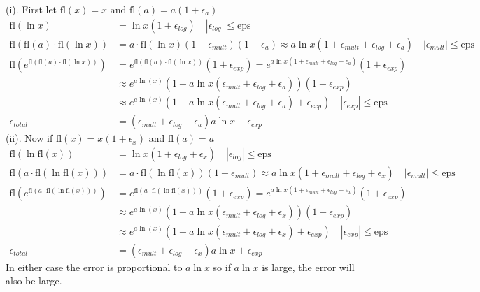 \documentclass[12pt]{article}
\begin{document}
(i). First let $\mathrm{fl}(x) = x$ and $\mathrm{fl}(a) = a(1+\epsilon_a)$
\begin{align*}
\mathrm{fl}(\ln x) &= \ln x(1 + \epsilon_{log}) \quad |\epsilon_{log}| \le \mathrm{eps}
\\
\mathrm{fl}(\mathrm{fl}(a) \cdot \mathrm{fl}(\ln x)) &= a \cdot \mathrm{fl}(\ln x)(1 + \epsilon_{mult}) (1 + \epsilon_a) \approx a \ln x (1 + \epsilon_{mult} + \epsilon_{log} + \epsilon_a) \quad |\epsilon_{mult}| \le \mathrm{eps}
\\
\mathrm{fl}(e^{\mathrm{fl}(\mathrm{fl}(a) \cdot \mathrm{fl}(\ln x))}) &= e^{\mathrm{fl}(\mathrm{fl}(a) \cdot \mathrm{fl}(\ln x))} (1 + \epsilon_{exp}) = e^{a \ln x (1 + \epsilon_{mult} + \epsilon_{log} + \epsilon_a)}(1 + \epsilon_{exp})
\\
&\approx e^{a \ln(x)}(1 + a \ln x (\epsilon_{mult} + \epsilon_{log} + \epsilon_a))(1 + \epsilon_{exp})
\\
&\approx e^{a \ln(x)}(1 + a \ln x (\epsilon_{mult} + \epsilon_{log} + \epsilon_a) + \epsilon_{exp}) \quad |\epsilon_{exp}| \le \mathrm{eps}
\\
\epsilon_{total} &= (\epsilon_{mult} + \epsilon_{log} + \epsilon_a) a \ln x + \epsilon_{exp}
\end{align*}
(ii). Now if $\mathrm{fl}(x) = x(1 + \epsilon_x)$ and $\mathrm{fl}(a) = a$
\begin{align*}
\mathrm{fl}(\ln \mathrm{fl}(x)) &= \ln x(1 + \epsilon_{log} + \epsilon_x) \quad |\epsilon_{log}| \le \mathrm{eps}
\\
\mathrm{fl}(a \cdot \mathrm{fl}(\ln \mathrm{fl}(x))) &= a \cdot \mathrm{fl}(\ln \mathrm{fl}(x))(1 + \epsilon_{mult}) \approx a \ln x (1 + \epsilon_{mult} + \epsilon_{log} + \epsilon_x) \quad |\epsilon_{mult}| \le \mathrm{eps}
\\
\mathrm{fl}(e^{\mathrm{fl}(a \cdot \mathrm{fl}(\ln \mathrm{fl}(x)))}) &= e^{\mathrm{fl}(a \cdot \mathrm{fl}(\ln \mathrm{fl}(x)))} (1 + \epsilon_{exp}) = e^{a \ln x (1 + \epsilon_{mult} + \epsilon_{log} + \epsilon_x)}(1 + \epsilon_{exp})
\\
&\approx e^{a \ln(x)}(1 + a \ln x (\epsilon_{mult} + \epsilon_{log} + \epsilon_x))(1 + \epsilon_{exp})
\\
&\approx e^{a \ln(x)}(1 + a \ln x (\epsilon_{mult} + \epsilon_{log} + \epsilon_x) + \epsilon_{exp}) \quad |\epsilon_{exp}| \le \mathrm{eps}
\\
\epsilon_{total} &= (\epsilon_{mult} + \epsilon_{log} + \epsilon_x) a \ln x + \epsilon_{exp}
\end{align*}
In either case the error is proportional to $a \ln x$ so if $a \ln x$ is large, the error will also be large.
\end{document}
